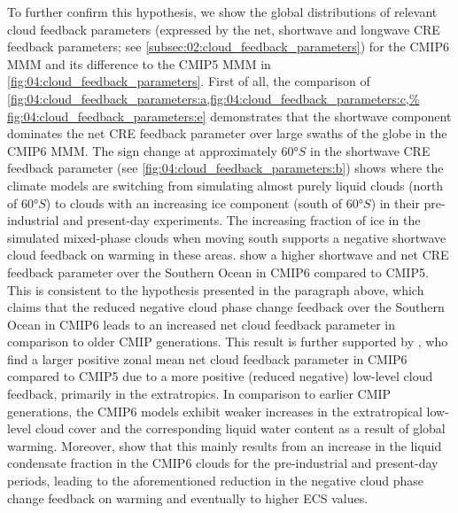To further confirm this hypothesis, we show the global distributions of
relevant cloud feedback parameters (expressed by the net, shortwave and
longwave \ac{CRE} feedback parameters; see
\cref{subsec:02:cloud_feedback_parameters}) for the \acs{CMIP}6 \ac{MMM} and
its difference to the \acs{CMIP}5 \ac{MMM} in
\cref{fig:04:cloud_feedback_parameters}. First of all, the comparison of
\cref{fig:04:cloud_feedback_parameters:a,fig:04:cloud_feedback_parameters:c,%
  fig:04:cloud_feedback_parameters:e} demonstrates that the shortwave component
dominates the net \ac{CRE} feedback parameter over large swaths of the globe
in the \acs{CMIP}6 \ac{MMM}. The sign change at approximately $60
\unit{\degree S}$ in the shortwave \ac{CRE} feedback parameter (see
\cref{fig:04:cloud_feedback_parameters:b}) shows where the climate models are
switching from simulating almost purely liquid clouds (north of $60
\unit{\degree S}$) to clouds with an increasing ice component (south of $60
\unit{\degree S}$) in their pre-industrial and present-day experiments. The
increasing fraction of ice in the simulated mixed-phase clouds when moving
south supports a negative shortwave cloud feedback on warming in these areas.
show a higher shortwave and net \ac{CRE} feedback parameter over the Southern
Ocean in \acs{CMIP}6 compared to \acs{CMIP}5. This is consistent to the
hypothesis presented in the paragraph above, which claims that the reduced
negative cloud phase change feedback over the Southern Ocean in \acs{CMIP}6
leads to an increased net cloud feedback parameter in comparison to older
\ac{CMIP} generations. This result is further supported by
\textcite{Zelinka2020}, who find a larger positive zonal mean net cloud
feedback parameter in \acs{CMIP}6 compared to \acs{CMIP}5 due to a more
positive (reduced negative) low-level cloud feedback, primarily in the
extratropics. In comparison to earlier \acs{CMIP} generations, the
\acs{CMIP}6 models exhibit weaker increases in the extratropical low-level
cloud cover and the corresponding liquid water content as a result of global
warming. Moreover, \textcite{Zelinka2020} show that this mainly results from
an increase in the liquid condensate fraction in the \acs{CMIP}6 clouds for
the pre-industrial and present-day periods, leading to the aforementioned
reduction in the negative cloud phase change feedback on warming and
eventually to higher \ac{ECS} values.
